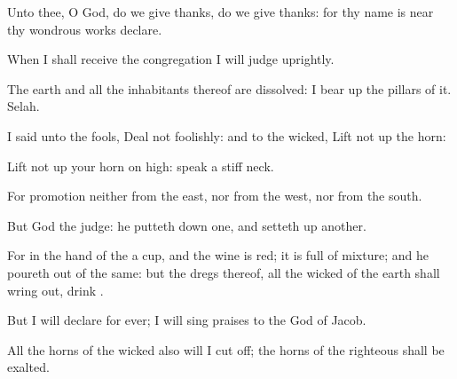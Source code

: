 {\Q {}Unto thee, O
God, do we give
thanks,
{} do we give
thanks: for
{} thy
name is
near thy wondrous
works
declare.


\par }{\Q {}When I shall
receive the
congregation I will
judge
uprightly.


\par }{\Q {}The
earth and all the
inhabitants thereof are
dissolved: I bear
up the
pillars of it.
Selah.


\par }{\Q {}I
said unto the
fools, Deal not
foolishly: and to the
wicked, Lift not
up the
horn:


\par }{\Q {}Lift not
up your
horn on
high:
speak
{} a
stiff
neck.


\par }{\BB \par }
{\Q {}For
promotion
{} neither from the
east, nor from the
west, nor from the
south.


\par }{\Q {}But
God
{} the
judge: he putteth
down one, and setteth
up another.


\par }{\Q {}For in the
hand of the
{}
{} a
cup, and the
wine is
red; it is
full of
mixture; and he poureth
out of the
same: but the
dregs thereof, all the
wicked of the
earth shall wring
{}
out,
{}
drink
{}.


\par }{\Q {}But I will
declare for
ever; I will sing
praises to the
God of
Jacob.


\par }{\Q {}All the
horns of the
wicked also will I cut
off;
{} the
horns of the
righteous shall be
exalted.




\par }
